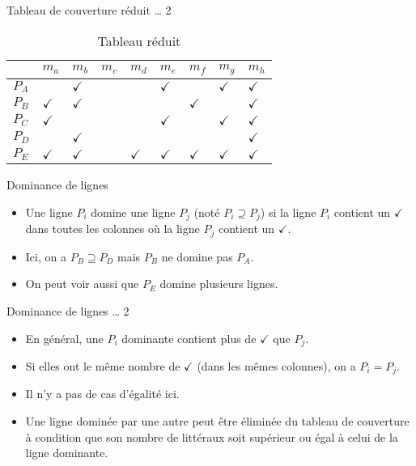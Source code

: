 \documentclass[presentation]{beamer}
\begin{document}
\begin{frame}[label={sec:orge3df187}]{Tableau de couverture réduit \ldots{} 2}
\begin{table}[htbp]
\caption{\label{tab:orgb12cf3e}Tableau réduit}
\centering
\begin{tabular}{lllllllll}
 & \(m_a\) & \(m_b\) & \(m_c\) & \(m_d\) & \(m_e\) & \(m_f\) & \(m_g\) & \(m_h\)\\
\hline
\(P_A\) &  & \(\checkmark\) &  &  & \(\checkmark\) &  & \(\checkmark\) & \(\checkmark\)\\
\(P_B\) & \(\checkmark\) & \(\checkmark\) &  &  &  & \(\checkmark\) &  & \(\checkmark\)\\
\(P_C\) & \(\checkmark\) &  &  &  & \(\checkmark\) &  & \(\checkmark\) & \(\checkmark\)\\
\(P_D\) &  & \(\checkmark\) &  &  &  &  &  & \(\checkmark\)\\
\(P_E\) & \(\checkmark\) & \(\checkmark\) &  & \(\checkmark\) & \(\checkmark\) & \(\checkmark\) & \(\checkmark\) & \(\checkmark\)\\
\end{tabular}
\end{table}
\end{frame}


\begin{frame}[label={sec:org3d162a0}]{Dominance de lignes}
\begin{itemize}
\item Une ligne \(P_i\) domine une ligne \(P_j\) (noté \(P_i \supseteq P_j\)) si la ligne \(P_i\) contient un \(\checkmark\) dans toutes les colonnes où la ligne \(P_j\) contient un \(\checkmark\).

\item Ici, on a \(P_B \supseteq P_D\) mais \(P_B\) ne domine pas \(P_A\).

\item On peut voir aussi que \(P_E\) domine plusieurs lignes.
\end{itemize}
\end{frame}

\begin{frame}[label={sec:org55702df}]{Dominance de lignes \ldots{} 2}
\begin{itemize}
\item En général, une \(P_i\) dominante contient plus de \(\checkmark\) que \(P_j\).

\item Si elles ont le même nombre de \(\checkmark\) (dans les mêmes colonnes), on a \(P_i = P_j\).

\item Il n'y a pas de cas d'égalité ici.

\item Une ligne \alert{dominée} par une autre peut être éliminée du tableau de couverture à condition que son nombre de littéraux soit supérieur ou égal à celui de la ligne dominante.
\end{itemize}
\end{frame}
\end{document}
